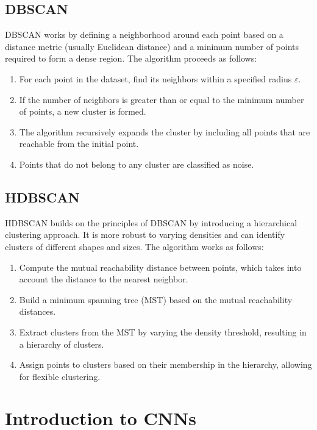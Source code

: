 \subsection*{DBSCAN}
\label{subsec:dbscan}

DBSCAN works by defining a neighborhood around each point based on a distance metric (usually Euclidean distance) and a
minimum number of points required to form a dense region. The algorithm proceeds as follows:

\begin{enumerate}
	\item For each point in the dataset, find its neighbors within a specified radius $\varepsilon$.
	\item If the number of neighbors is greater than or equal to the minimum number of points, a new cluster is formed.
	\item The algorithm recursively expands the cluster by including all points that are reachable from the initial point.
	\item Points that do not belong to any cluster are classified as noise.
\end{enumerate}

\subsection*{HDBSCAN}
\label{subsec:hdbscan}

HDBSCAN builds on the principles of DBSCAN by introducing a hierarchical clustering approach. It is more robust to varying
densities and can identify clusters of different shapes and sizes. The algorithm works as follows:

\begin{enumerate}
	\item Compute the mutual reachability distance between points, which takes into account the distance to the nearest neighbor.
	\item Build a minimum spanning tree (MST) based on the mutual reachability distances.
	\item Extract clusters from the MST by varying the density threshold, resulting in a hierarchy of clusters.
	\item Assign points to clusters based on their membership in the hierarchy, allowing for flexible clustering.
\end{enumerate}

\section{Introduction to CNNs}
\label{sec:intro_cnn}

